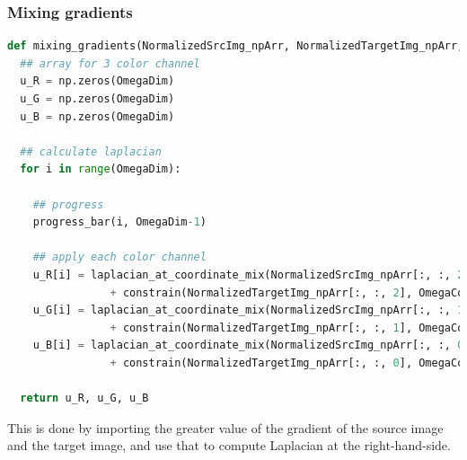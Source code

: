 \documentclass[10pt, a4paper]{article}%
\begin{document}
 \subsubsection{Mixing gradients}
 \begin{lstlisting}[language=python]
 def mixing_gradients(NormalizedSrcImg_npArr, NormalizedTargetImg_npArr, OmegaCoordinateArr, Outline, Neighborhood_existence, OmegaDim):
  ## array for 3 color channel
  u_R = np.zeros(OmegaDim)
  u_G = np.zeros(OmegaDim)
  u_B = np.zeros(OmegaDim)

  ## calculate laplacian
  for i in range(OmegaDim):

    ## progress
    progress_bar(i, OmegaDim-1)

    ## apply each color channel
    u_R[i] = laplacian_at_coordinate_mix(NormalizedSrcImg_npArr[:, :, 2], NormalizedTargetImg_npArr[:, :, 2], OmegaCoordinateArr[i], Neighborhood_existence[i]) \
                + constrain(NormalizedTargetImg_npArr[:, :, 2], OmegaCoordinateArr[i], Outline, Neighborhood_existence[i])
    u_G[i] = laplacian_at_coordinate_mix(NormalizedSrcImg_npArr[:, :, 1], NormalizedTargetImg_npArr[:, :, 1], OmegaCoordinateArr[i], Neighborhood_existence[i]) \
                + constrain(NormalizedTargetImg_npArr[:, :, 1], OmegaCoordinateArr[i], Outline, Neighborhood_existence[i])                  
    u_B[i] = laplacian_at_coordinate_mix(NormalizedSrcImg_npArr[:, :, 0], NormalizedTargetImg_npArr[:, :, 0], OmegaCoordinateArr[i], Neighborhood_existence[i]) \
                + constrain(NormalizedTargetImg_npArr[:, :, 0], OmegaCoordinateArr[i], Outline, Neighborhood_existence[i])
             
  return u_R, u_G, u_B
 \end{lstlisting}
 This is done by importing the greater value of the gradient of the source image and the target image, and use that to compute Laplacian at the right-hand-side. 
\end{document}
